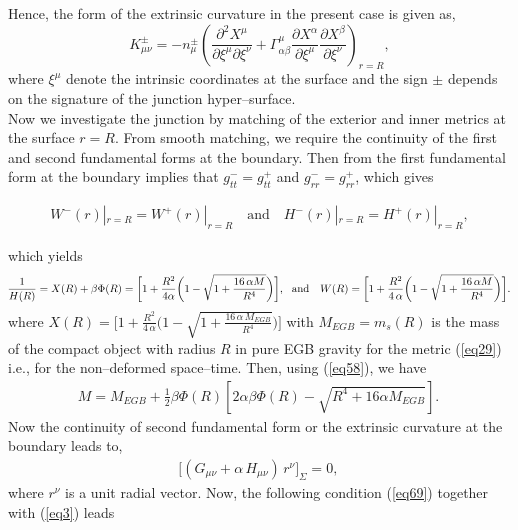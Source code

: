 \documentclass[]{aastex631}
\begin{document}
Hence, the form of the extrinsic curvature in the present case is given as, 
\begin{equation}
{K}^{\pm}_{\mu\nu}=-n^{\pm}_{\mu}\left(\frac{\partial^{2}X^{\mu}}{\partial\xi^{\mu}\partial\xi^{\nu}}+\Gamma^{\mu}_{\alpha \beta}\frac{\partial X^{\alpha}}{\partial\xi^{\mu}}\frac{\partial X^{\beta}}{\partial\xi^{\nu}}\right)_{r = R}, \label{eq65}
\end{equation}
where $\xi^{\mu}$ denote the intrinsic coordinates at the surface and the sign $\pm$ depends on the signature of the junction hyper--surface. \\
Now we investigate the junction by matching of the exterior and inner metrics at the surface $r=R$. From smooth matching, we require the continuity of the first and second fundamental forms at the boundary. Then from the first fundamental form at the boundary implies that $g_{tt}^{-} = g_{tt}^{+}$ and $g_{rr}^{-} = g_{rr}^{+}$, which gives
\begin{small}
\begin{eqnarray}
W^{-}(r)|_{r=R}=W^{+}(r)|_{r=R} \quad \mbox{and} \quad   H^{-}(r)|_{r=R}=H^{+}(r)|_{r=R}, \label{eq66}
\end{eqnarray}
\end{small}
which yields
\begin{eqnarray}
&&\hspace{-0.4cm} \frac{1}{H(R)} = X(R)+\beta \Phi(R) =\bigg[1 + \frac{R^2}{4 \alpha}\bigg(1 - \sqrt{1 + \frac{16\, \alpha M}{R^4}}\bigg)\bigg],~~\text{and}~~~
W(R)=\bigg[1 + \frac{R^2}{4\,\alpha}\bigg(1 - \sqrt{1 + \frac{16\, \alpha M}{R^4}}\bigg)\bigg].\label{eq67}
\end{eqnarray}
where $X(R) = \big[1 + \frac{R^2}{4\,\alpha}\big(1 - \sqrt{1 + \frac{16\, \alpha\, M_{EGB}}{R^4}}\big)\big]$ with $M_{EGB} = m_{s}(R)$ is the mass of the compact object with radius $R$ in pure EGB gravity for the metric (\ref{eq29}) i.e., for the non--deformed space--time. Then, using (\ref{eq58}), we have
\begin{eqnarray}\label{effectivemass}
M=M_{EGB}+ \frac{1}{2}\beta  \Phi(R) \left[2\alpha\beta \Phi(R)-\sqrt{R^4 +16 \alpha M_{EGB}}\right].~ \label{eq68}
\end{eqnarray}
Now the continuity of second fundamental form or the extrinsic curvature at the boundary leads to, 
\begin{eqnarray}
\big[(G_{\mu\nu}+\alpha\,H_{\mu\nu})\,r^{\nu}\big]_{\Sigma}=0 , \,\label{eq69}
\end{eqnarray}
where $r^{\nu}$ is a unit radial vector. Now, the following condition (\ref{eq69}) together with (\ref{eq3}) leads 
\end{document}

